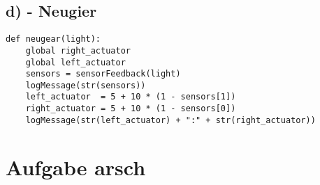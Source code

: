 \documentclass{./Vorlage/mat}
\begin{document}
\subsection*{d) - Neugier}
\begin{lstlisting}
def neugear(light):
    global right_actuator
    global left_actuator
    sensors = sensorFeedback(light)
    logMessage(str(sensors))
    left_actuator  = 5 + 10 * (1 - sensors[1])
    right_actuator = 5 + 10 * (1 - sensors[0])
    logMessage(str(left_actuator) + ":" + str(right_actuator))
\end{lstlisting}


\section*{Aufgabe arsch}
\end{document}

